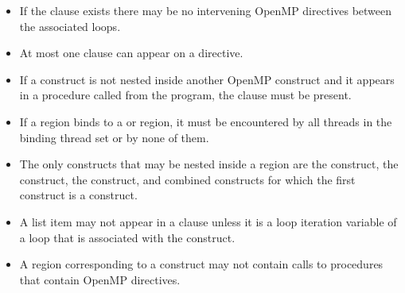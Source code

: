\begin{itemize}
  \item If the  clause exists there may be no intervening OpenMP
    directives between the associated loops.



  \item At most one  clause can appear on a  directive.

  \item If a  construct is not nested inside another OpenMP
      construct and it appears in a procedure called from the program, the
       clause must be present.

  \item If a  region binds to a  or 
      region, it must be encountered by all threads in the binding thread set
      or by none of them.

  \item The only constructs that may be nested inside a  region
    are the  construct, the  construct, the
     construct, and combined constructs for which the first
    construct is a  construct.

  \item A list item may not appear in a  clause unless it
    is a loop iteration variable of a loop that is associated with the
    construct.


  \item A  region corresponding to a  construct may not
    contain calls to procedures that contain OpenMP directives. 



\end{itemize}
